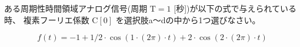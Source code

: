 ある周期性時間領域アナログ信号(周期 $\textrm{T} = 1$ [秒])が以下の式で与えられている時、
複素フーリエ係数 $\textrm{C}[0]$ を選択肢a〜dの中から1つ選びなさい。

\[
f(t) = 
-1
+ 1/2 \cdot \cos( 1 \cdot (2\pi) \cdot t )
+   2 \cdot \cos( 2 \cdot (2\pi) \cdot t )
\]
